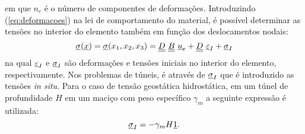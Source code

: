 em que $n_c$  é o número de componentes de deformações. Introduzindo (\ref{eq:deformacoes}) na lei de comportamento do material, é possível determinar as tensões no interior do elemento também em função dos deslocamentos nodais:
\begin{equation}
	\label{eq:tensoes}
	\underline \sigma(\underline x) = \underline \sigma(x_1,x_2,x_3) = \underline{\underline D} ~ \underline{\underline B} ~\underline u_e + \underline{\underline D} ~\underline{\varepsilon}_I + \underline \sigma_I
\end{equation}
na qual $\underline{\varepsilon}_I$ e $\underline \sigma_I$ são deformações e tensões iniciais no interior do elemento, respectivamente. Nos problemas de túneis, é através de $\underline \sigma_I$ que é introduzido as tensões \textit{in situ}. Para o caso de tensão geostática hidrostática, em um túnel de profundidade $H$ em um maciço com peso específico $\gamma_m$ a seguinte expressão é utilizada:
\begin{equation}
	\label{eq:tensoes_iniciais}
	\underline \sigma_I = -\gamma_m H \underline{1}.
\end{equation}

